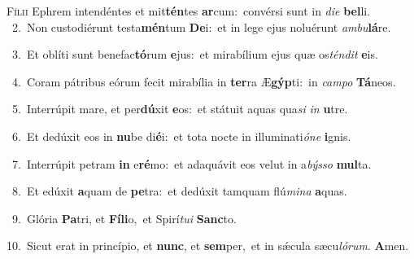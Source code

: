 \lettrine{\initial\textcolor{\initialcolor}{F}}{ílii} Ephrem intendéntes et mit\-\textbf{tén}\-tes \textbf{ar}\-cum:~\star convérsi sunt in \textit{di}\-\textit{e} \textbf{bel}\-li.\\
{\numbfont\textcolor{\numbcolor}{~2.}}~Non custodiérunt testa\-\textbf{mén}\-tum \textbf{De}\-i:~\star et in lege ejus noluérunt \textit{am}\-\textit{bu}\textbf{lá}re.\par
{\numbfont\textcolor{\numbcolor}{~3.}}~Et oblíti sunt benefac\-\textbf{tó}\-rum \textbf{e}\-jus:~\star et mirabílium ejus quæ os\-\textit{tén}\-\textit{dit} \textbf{e}\-is.\par
{\numbfont\textcolor{\numbcolor}{~4.}}~Coram pátribus eórum fecit mirabília in \textbf{ter}\-ra Æ\-\textbf{gýp}\-ti:~\star in \textit{cam}\-\textit{po} \textbf{Tá}\-neos.\par
{\numbfont\textcolor{\numbcolor}{~5.}}~Interrúpit mare, et per\-\textbf{dú}\-xit \textbf{e}\-os:~\star et státuit aquas qua\textit{si} \textit{in} \textbf{u}\-tre.\par
{\numbfont\textcolor{\numbcolor}{~6.}}~Et dedúxit eos in \textbf{nu}\-be di\-\textbf{é}\-i:~\star et tota nocte in illuminati\-\textit{ó}\-\textit{ne} \textbf{i}\-gnis.\par
{\numbfont\textcolor{\numbcolor}{~7.}}~Interrúpit petram \textbf{in} e\-\textbf{ré}\-mo:~\star et adaquávit eos velut in a\-\textit{býs}\-\textit{so} \textbf{mul}\-ta.\par
{\numbfont\textcolor{\numbcolor}{~8.}}~Et edúxit \textbf{a}\-quam de \textbf{pe}\-tra:~\star et dedúxit tamquam flú\-\textit{mi}\-\textit{na} \textbf{a}\-quas.\par
{\numbfont\textcolor{\numbcolor}{~9.}}~Glória \textbf{Pa}\-tri, et \textbf{Fí}\-\textbf{li}o,~\star et Spirí\-\textit{tu}\-\textit{i} \textbf{Sanc}\-to.\par
{\numbfont\textcolor{\numbcolor}{10.}}~Sicut erat in princípio, et \textbf{nunc}\-, et \textbf{sem}\-per,~\star et in sǽcula sæcu\-\textit{ló}\-\textit{rum}. \textbf{A}\-men.\par
